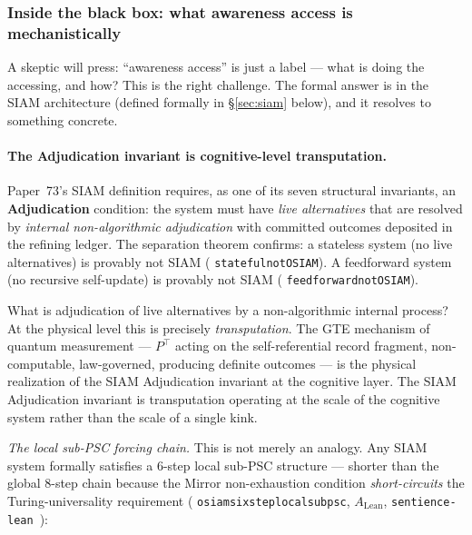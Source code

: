 \documentclass[11pt]{article}
\theoremstyle{remark}
\newcommand{\lean}[1]{%
  \penalty-100
  \begingroup\def\_{\textunderscore\allowbreak}\texttt{#1}\endgroup}
\begin{document}
\subsubsection*{Inside the black box: what awareness access is mechanistically}

A skeptic will press: ``awareness access'' is just a label --- what is doing the
accessing, and how? This is the right challenge. The formal answer is in the SIAM
architecture (defined formally in \S\ref{sec:siam} below), and it resolves to
something concrete.

\paragraph{The Adjudication invariant is cognitive-level transputation.}
Paper~73's SIAM definition requires, as one of its seven structural invariants,
an \textbf{Adjudication} condition: the system must have \emph{live alternatives}
that are resolved by \emph{internal non-algorithmic adjudication} with committed
outcomes deposited in the refining ledger. The separation theorem confirms: a
stateless system (no live alternatives) is provably not SIAM
(\lean{stateful\_not\_OSIAM}). A feedforward system (no recursive self-update) is
provably not SIAM (\lean{feedforward\_not\_OSIAM}).

What is adjudication of live alternatives by a non-algorithmic internal process? At
the physical level this is precisely \emph{transputation}. The GTE mechanism of
quantum measurement --- $P^\top$ acting on the self-referential record fragment,
non-computable, law-governed, producing definite outcomes --- is the physical
realization of the SIAM Adjudication invariant at the cognitive layer. The SIAM
Adjudication invariant is transputation operating at the scale of the cognitive
system rather than the scale of a single kink.

\medskip
\noindent\textit{The local sub-PSC forcing chain.}
This is not merely an analogy. Any SIAM system formally satisfies a 6-step local
sub-PSC structure --- shorter than the global 8-step chain because the Mirror
non-exhaustion condition \emph{short-circuits} the Turing-universality requirement
(\lean{osiam\_six\_step\_local\_subpsc}, $A_\text{Lean}$, \texttt{sentience-lean}~\cite{SpivackNEMSHub}):
\end{document}
